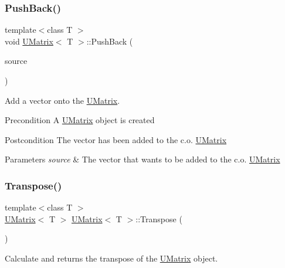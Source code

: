 \subsubsection{\texorpdfstring{PushBack()}{PushBack()}}
{\footnotesize\ttfamily template$<$class T $>$ \\
void \mbox{\hyperlink{class_u_matrix}{U\+Matrix}}$<$ T $>$\+::Push\+Back (\begin{DoxyParamCaption}\item[{const \mbox{\hyperlink{class_my_vector}{My\+Vector}}$<$ T $>$ \&}]{source }\end{DoxyParamCaption})}



Add a vector onto the \mbox{\hyperlink{class_u_matrix}{U\+Matrix}}. 

\begin{DoxyPrecond}{Precondition}
A \mbox{\hyperlink{class_u_matrix}{U\+Matrix}} object is created 
\end{DoxyPrecond}
\begin{DoxyPostcond}{Postcondition}
The vector has been added to the c.\+o. \mbox{\hyperlink{class_u_matrix}{U\+Matrix}}
\end{DoxyPostcond}

\begin{DoxyParams}{Parameters}
{\em source} & The vector that wants to be added to the c.\+o. \mbox{\hyperlink{class_u_matrix}{U\+Matrix}} \\
\hline
\end{DoxyParams}
\mbox{\label{class_u_matrix_a0aa03e248a41c8b1535d93bc67b4e4f1}} 
\subsubsection{\texorpdfstring{Transpose()}{Transpose()}}
{\footnotesize\ttfamily template$<$class T $>$ \\
\mbox{\hyperlink{class_u_matrix}{U\+Matrix}}$<$ T $>$ \mbox{\hyperlink{class_u_matrix}{U\+Matrix}}$<$ T $>$\+::Transpose (\begin{DoxyParamCaption}{ }\end{DoxyParamCaption})}



Calculate and returns the transpose of the \mbox{\hyperlink{class_u_matrix}{U\+Matrix}} object. 

